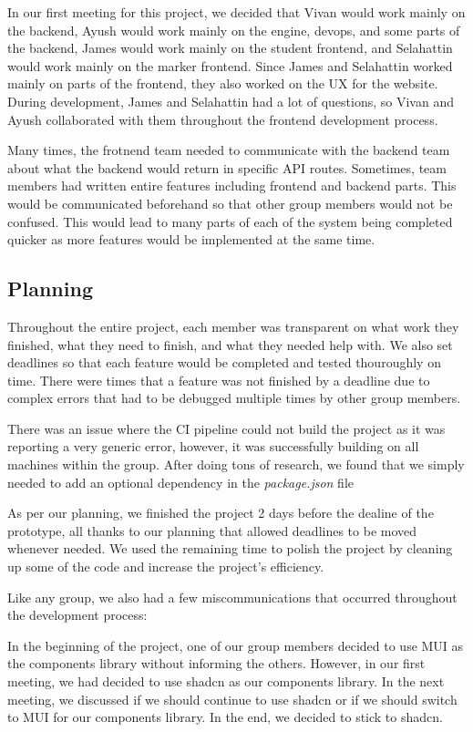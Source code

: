 \documentclass[a4paper, 12pt]{article}
\newcommand{\Example}[1]{\begin{example}#1\end{example}}
\begin{document}
In our first meeting for this project, we decided that Vivan would work mainly on the backend, Ayush would work mainly on the engine, devops, and some parts of the backend, James would work mainly on the student frontend, and Selahattin would work mainly on the marker frontend. Since James and Selahattin worked mainly on parts of the frontend, they also worked on the UX for the website. During development, James and Selahattin had a lot of questions, so Vivan and Ayush collaborated with them throughout the frontend development process.

Many times, the frotnend team needed to communicate with the backend team about what the backend would return in specific API routes. Sometimes, team members had written entire features including frontend and backend parts. This would be communicated beforehand so that other group members would not be confused. This would lead to many parts of each of the system being completed quicker as more features would be implemented at the same time.

\subsection*{Planning}
Throughout the entire project, each member was transparent on what work they finished, what they need to finish, and what they needed help with. We also set deadlines so that each feature would be completed and tested thouroughly on time. There were times that a feature was not finished by a deadline due to complex errors that had to be debugged multiple times by other group members.

\Example {There was an issue where the CI pipeline could not build the project as it was reporting a very generic error, however, it was successfully building on all machines within the group. After doing tons of research, we found that we simply needed to add an optional dependency in the \emph{package.json} file}

As per our planning, we finished the project 2 days before the dealine of the prototype, all thanks to our planning that allowed deadlines to be moved whenever needed. We used the remaining time to polish the project by cleaning up some of the code and increase the project's efficiency.

Like any group, we also had a few miscommunications that occurred throughout the development process:

\Example {In the beginning of the project, one of our group members decided to use MUI as the components library without informing the others. However, in our first meeting, we had decided to use shadcn as our components library. In the next meeting, we discussed if we should continue to use shadcn or if we should switch to MUI for our components library. In the end, we decided to stick to shadcn.}
         
\end{document}
